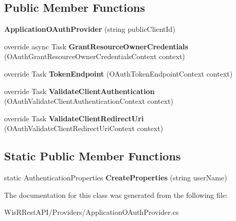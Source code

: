 \subsection*{Public Member Functions}
\begin{DoxyCompactItemize}
\item 
\hypertarget{class_wis_r_rest_a_p_i_1_1_providers_1_1_application_o_auth_provider_a4529818466516124c2c443723b786cb8}{}{\bfseries Application\+O\+Auth\+Provider} (string public\+Client\+Id)\label{class_wis_r_rest_a_p_i_1_1_providers_1_1_application_o_auth_provider_a4529818466516124c2c443723b786cb8}

\item 
\hypertarget{class_wis_r_rest_a_p_i_1_1_providers_1_1_application_o_auth_provider_a9ff0596f9c24c68685a6226883d5d6b2}{}override async Task {\bfseries Grant\+Resource\+Owner\+Credentials} (O\+Auth\+Grant\+Resource\+Owner\+Credentials\+Context context)\label{class_wis_r_rest_a_p_i_1_1_providers_1_1_application_o_auth_provider_a9ff0596f9c24c68685a6226883d5d6b2}

\item 
\hypertarget{class_wis_r_rest_a_p_i_1_1_providers_1_1_application_o_auth_provider_a8c13bea58bb0cbd9bbe1605cafb8e7c2}{}override Task {\bfseries Token\+Endpoint} (O\+Auth\+Token\+Endpoint\+Context context)\label{class_wis_r_rest_a_p_i_1_1_providers_1_1_application_o_auth_provider_a8c13bea58bb0cbd9bbe1605cafb8e7c2}

\item 
\hypertarget{class_wis_r_rest_a_p_i_1_1_providers_1_1_application_o_auth_provider_a684c198bbdf34f4884a4f381372a70d0}{}override Task {\bfseries Validate\+Client\+Authentication} (O\+Auth\+Validate\+Client\+Authentication\+Context context)\label{class_wis_r_rest_a_p_i_1_1_providers_1_1_application_o_auth_provider_a684c198bbdf34f4884a4f381372a70d0}

\item 
\hypertarget{class_wis_r_rest_a_p_i_1_1_providers_1_1_application_o_auth_provider_a7f158c61a3d286237b2e9c354bcd2266}{}override Task {\bfseries Validate\+Client\+Redirect\+Uri} (O\+Auth\+Validate\+Client\+Redirect\+Uri\+Context context)\label{class_wis_r_rest_a_p_i_1_1_providers_1_1_application_o_auth_provider_a7f158c61a3d286237b2e9c354bcd2266}

\end{DoxyCompactItemize}
\subsection*{Static Public Member Functions}
\begin{DoxyCompactItemize}
\item 
\hypertarget{class_wis_r_rest_a_p_i_1_1_providers_1_1_application_o_auth_provider_ac77f4da28cba63241882bed890101783}{}static Authentication\+Properties {\bfseries Create\+Properties} (string user\+Name)\label{class_wis_r_rest_a_p_i_1_1_providers_1_1_application_o_auth_provider_ac77f4da28cba63241882bed890101783}

\end{DoxyCompactItemize}


The documentation for this class was generated from the following file\+:\begin{DoxyCompactItemize}
\item 
Wis\+R\+Rest\+A\+P\+I/\+Providers/Application\+O\+Auth\+Provider.\+cs\end{DoxyCompactItemize}

